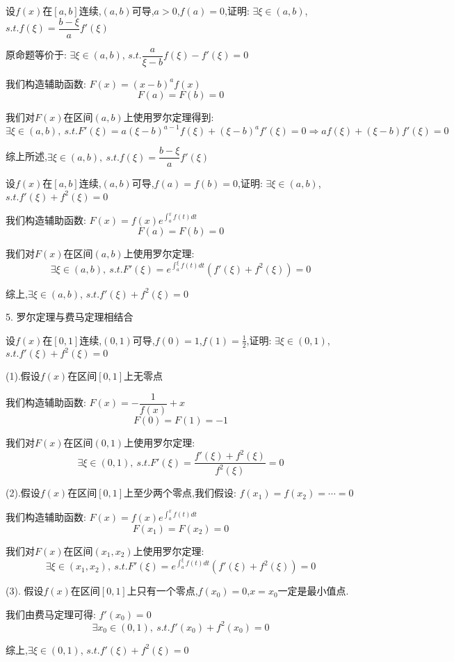 \begin{proposition}
	设$f(x)$在$[a,b]$连续,$(a,b)$可导,$a>0$,$f(a)=0$,证明: $\exists \xi\in(a,b)$, $s.t. f(\xi)=\dfrac{b-\xi}{a}f'(\xi)$
\end{proposition}
\begin{solution}

	原命题等价于: $\exists \xi\in(a,b)$, $s.t. \dfrac{a}{\xi-b}f(\xi)-f'(\xi)=0$

	我们构造辅助函数: $F(x)=(x-b)^af(x)$
	$$F(a)=F(b)=0$$

	我们对$F(x)$在区间$(a,b)$上使用罗尔定理得到:
	$$\exists \xi\in(a,b),\ s.t. F'(\xi)= a(\xi-b)^{a-1}f(\xi)+(\xi-b)^a f'(\xi)=0\Rightarrow af(\xi)+(\xi-b) f'(\xi)=0$$

	综上所述,$\exists \xi\in(a,b),\ s.t. f(\xi)=\dfrac{b-\xi}{a}f'(\xi)$
\end{solution}


\begin{proposition}
	设$f(x)$在$[a,b]$连续,$(a,b)$可导,$f(a)=f(b)=0$,证明: $\exists \xi\in(a,b)$, $s.t. f'(\xi)+f^{2}(\xi)=0$
\end{proposition}
\begin{solution}

	我们构造辅助函数: $F(x)=f(x)e^{\int_{a}^{x}f(t)dt}$
	$$F(a)=F(b)=0$$

	我们对$F(x)$在区间$(a,b)$上使用罗尔定理:
	$$\exists \xi\in(a,b),\ s.t. F'(\xi)=e^{\int_{a}^{\xi}f(t)dt}(f'(\xi)+f^2(\xi))=0$$

	综上,$\exists \xi\in(a,b)$, $s.t. f'(\xi)+f^{2}(\xi)=0$
\end{solution}


5. 罗尔定理与费马定理相结合
\begin{proposition}
	设$f(x)$在$[0,1]$连续,$(0,1)$可导,$f(0)=1$,$f(1)=\frac{1}{2}$,证明: $\exists \xi\in(0,1)$, $s.t. f'(\xi)+f^{2}(\xi)=0$
\end{proposition}
\begin{solution}

	(1).假设$f(x)$在区间$[0,1]$上无零点

	我们构造辅助函数: $F(x)=-\dfrac{1}{f(x)}+x$
	$$F(0)=F(1)=-1$$

	我们对$F(x)$在区间$(0,1)$上使用罗尔定理:
	$$\exists \xi\in(0,1),\ s.t. F'(\xi)=\dfrac{f'(\xi)+f^{2}(\xi)}{f^2(\xi)}=0$$

	(2).假设$f(x)$在区间$[0,1]$上至少两个零点,我们假设: $f(x_{1})=f(x_{2})=\cdots=0$

	我们构造辅助函数: $F(x)=f(x)e^{\int_{a}^{x}f(t)dt}$
	$$F(x_{1})=F(x_{2})=0$$

	我们对$F(x)$在区间$(x_{1},x_{2})$上使用罗尔定理:
	$$\exists \xi\in(x_{1},x_{2}),\ s.t. F'(\xi)=e^{\int_{a}^{\xi}f(t)dt}(f'(\xi)+f^2(\xi))=0$$

	(3). 假设$f(x)$在区间$[0,1]$上只有一个零点,$f(x_{0})=0$,$x=x_{0}$一定是最小值点.

	我们由费马定理可得: $f'(x_{0})=0$
	$$\exists x_{0}\in(0,1),\ s.t. f'(x_{0})+f^{2}(x_{0})=0$$

	综上,$\exists \xi\in(0,1)$, $s.t. f'(\xi)+f^{2}(\xi)=0$
\end{solution}

